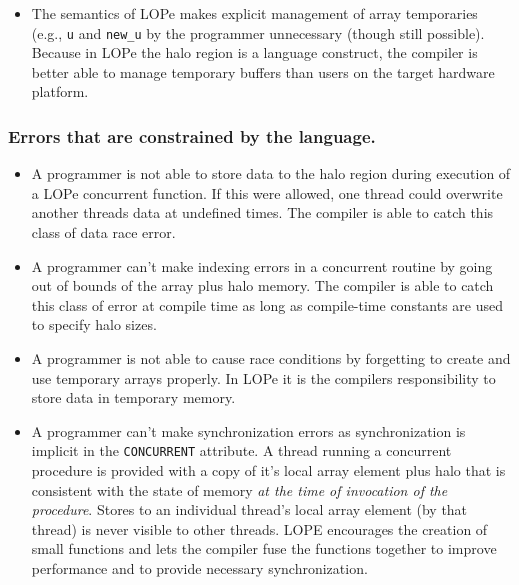 \begin{itemize}
\item
The semantics of LOPe makes explicit management of array temporaries (e.g., \texttt{u} and
\texttt{new\_u} by the programmer unnecessary (though still possible).  Because in LOPe the
halo region is a language construct, the compiler is better able to manage temporary
buffers than users on the target hardware platform.

\end{itemize}

\subsubsection{Errors that are constrained by the language.}
\begin{itemize}

\item
A programmer is not able to store data to the halo region during
execution of a LOPe concurrent function.  If this were allowed, one
thread could overwrite another threads data at undefined times.  The
compiler is able to catch this class of data race error.

\item
A programmer can't make indexing errors in a concurrent routine by going out of bounds of the array
plus halo memory.  The compiler is able to catch this class of error at compile time as long as
compile-time constants are used to specify halo sizes.

\item
A programmer is not able to cause race conditions by forgetting to create and use temporary arrays
properly.  In LOPe it is the compilers responsibility to store data in temporary memory.

\item
A programmer can't make synchronization errors as synchronization is
implicit in the \texttt{CONCURRENT} attribute.  A thread running a concurrent procedure is provided
with a copy of it's local array element plus halo that is consistent
with the state of memory \emph{at the time of invocation of the
  procedure}.  Stores to an individual thread's local array element
(by that thread) is never visible to other threads.  LOPE encourages
the creation of small functions and lets the compiler fuse the
functions together to improve performance and to provide necessary
synchronization.

\end{itemize}
